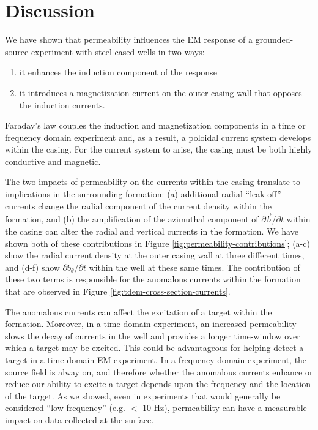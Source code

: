 \documentclass[onecolumn, extra, mreferee]{gji}
\begin{document}
\section{Discussion}
We have shown that permeability influences the EM response of a grounded-source experiment with steel cased wells in two ways:
\begin{enumerate}
\item it enhances the induction component of the response
\item it introduces a magnetization current on the outer casing wall that opposes the induction currents.
\end{enumerate}
Faraday's law couples the induction and magnetization components in a time or frequency domain experiment and, as a result, a poloidal current system develops within the casing. For the current system to arise, the casing must be both highly conductive and magnetic.

The two impacts of permeability on the currents within the casing translate to implications in the surrounding formation: (a) additional radial ``leak-off'' currents change the radial component of the current density within the formation, and (b) the amplification of the azimuthal component of $\partial \vec{b}/\partial t$ within the casing can alter the radial and vertical currents in the formation. We have shown both of these contributions in Figure \ref{fig:permeability-contributions}; (a-c) show the radial current density at the outer casing wall at three different times, and (d-f) show $\partial b_\theta / \partial t$ within the well at these same times. The contribution of these two terms is responsible for the anomalous currents within the formation that are observed in Figure \ref{fig:tdem-cross-section-currents}.



The anomalous currents can affect the excitation of a target within the formation. Moreover, in a time-domain experiment, an increased permeability slows the decay of currents in the well and provides a longer time-window over which a target may be excited. This could be advantageous for helping detect a target in a time-domain EM experiment. In a frequency domain experiment, the source field is alway on, and therefore whether the anomalous currents enhance or reduce our ability to excite a target depends upon the frequency and the location of the target.  As we showed, even in experiments that would generally be considered ``low frequency'' (e.g. $<$ 10 Hz), permeability can have a measurable impact on data collected at the surface.
\end{document}
